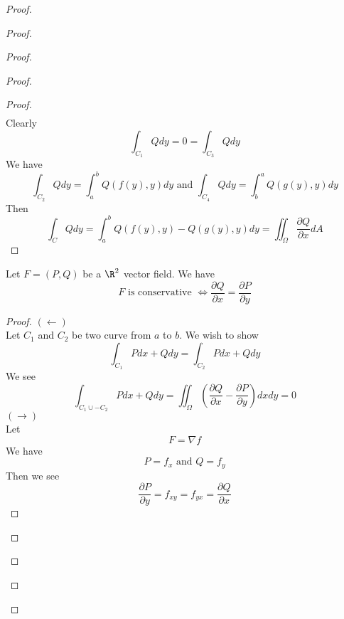 \documentclass{report}
\begin{document}
\begin{proof}
\begin{proof}
\begin{proof}
\begin{proof}
\begin{proof}
\begin{align}
\end{align}
Clearly 
\begin{equation}
\int_{C_1}Qdy=0=\int_{C_3}Qdy
\end{equation}
We have
\begin{equation}
\int_{C_2} Qdy=\int_a^b Q(f(y),y)dy\text{ and }\int_{C_4}Qdy=\int_b^a Q(g(y),y)dy
\end{equation}
Then
\begin{equation}
\int_C Qdy =\int_a^b Q(f(y),y)-Q(g(y),y)dy=\iint_{\Omega} \frac{\partial Q}{\partial x}dA
\end{equation}
\end{proof}
\begin{corollary}
\label{9.3.7}
Let $F=(P,Q)$ be a  $\R^2$ vector field. We have
\begin{equation}
F\text{ is conservative }\iff \frac{\partial Q}{\partial x}=\frac{\partial P}{\partial y}
\end{equation}
\end{corollary}
\begin{proof}
$(\longleftarrow)$\\

Let $C_1$ and  $C_2$ be two curve from  $a$ to  $b$. We wish to show 
 \begin{equation}
\int_{C_1} Pdx+Qdy=\int_{C_2} Pdx+Qdy
\end{equation}
We see 
\begin{equation}
\int_{C_1\cup -C_2}Pdx+Qdy=\iint_{\Omega}(\frac{\partial Q}{\partial x}-\frac{\partial P}{\partial y})dxdy=0
\end{equation}
$(\longrightarrow)$\\

Let 
 \begin{equation}
F=\nabla f
\end{equation}
We have
\begin{equation}
P=f_x\text{ and }Q=f_y
\end{equation}
Then we see
\begin{equation}
\frac{\partial P}{\partial y}=f_{xy}=f_{yx}=\frac{\partial Q}{\partial x}
\end{equation}
\end{proof}


\end{proof}
\end{proof}
\end{proof}
\end{proof}
\end{document}
